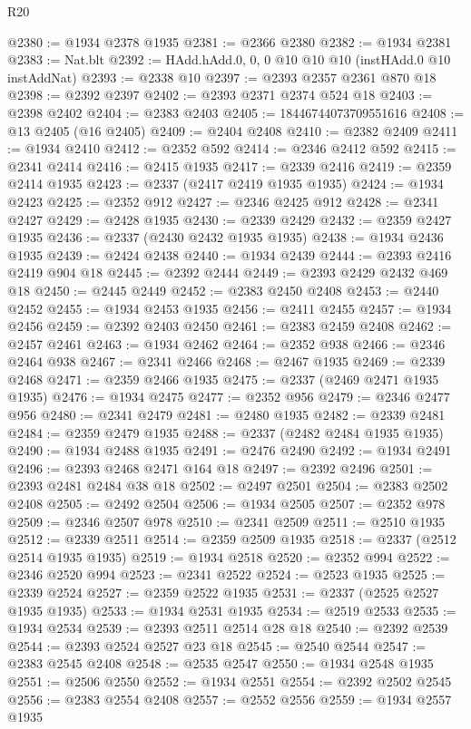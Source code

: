 \begin{lexlean}{R20}
\begin{coremodule}
@2380 := @1934 @2378 @1935
@2381 := @2366 @2380
@2382 := @1934 @2381
@2383 := Nat.blt
@2392 := HAdd.hAdd.{0, 0, 0} @10 @10 @10 (instHAdd.{0} @10 instAddNat)
@2393 := @2338 @10
@2397 := @2393 @2357 @2361 @870 @18
@2398 := @2392 @2397
@2402 := @2393 @2371 @2374 @524 @18
@2403 := @2398 @2402
@2404 := @2383 @2403
@2405 := 18446744073709551616
@2408 := @13 @2405 (@16 @2405)
@2409 := @2404 @2408
@2410 := @2382 @2409
@2411 := @1934 @2410
@2412 := @2352 @592
@2414 := @2346 @2412 @592
@2415 := @2341 @2414
@2416 := @2415 @1935
@2417 := @2339 @2416
@2419 := @2359 @2414 @1935
@2423 := @2337 (@2417 @2419 @1935 @1935)
@2424 := @1934 @2423
@2425 := @2352 @912
@2427 := @2346 @2425 @912
@2428 := @2341 @2427
@2429 := @2428 @1935
@2430 := @2339 @2429
@2432 := @2359 @2427 @1935
@2436 := @2337 (@2430 @2432 @1935 @1935)
@2438 := @1934 @2436 @1935
@2439 := @2424 @2438
@2440 := @1934 @2439
@2444 := @2393 @2416 @2419 @904 @18
@2445 := @2392 @2444
@2449 := @2393 @2429 @2432 @469 @18
@2450 := @2445 @2449
@2452 := @2383 @2450 @2408
@2453 := @2440 @2452
@2455 := @1934 @2453 @1935
@2456 := @2411 @2455
@2457 := @1934 @2456
@2459 := @2392 @2403 @2450
@2461 := @2383 @2459 @2408
@2462 := @2457 @2461
@2463 := @1934 @2462
@2464 := @2352 @938
@2466 := @2346 @2464 @938
@2467 := @2341 @2466
@2468 := @2467 @1935
@2469 := @2339 @2468
@2471 := @2359 @2466 @1935
@2475 := @2337 (@2469 @2471 @1935 @1935)
@2476 := @1934 @2475
@2477 := @2352 @956
@2479 := @2346 @2477 @956
@2480 := @2341 @2479
@2481 := @2480 @1935
@2482 := @2339 @2481
@2484 := @2359 @2479 @1935
@2488 := @2337 (@2482 @2484 @1935 @1935)
@2490 := @1934 @2488 @1935
@2491 := @2476 @2490
@2492 := @1934 @2491
@2496 := @2393 @2468 @2471 @164 @18
@2497 := @2392 @2496
@2501 := @2393 @2481 @2484 @38 @18
@2502 := @2497 @2501
@2504 := @2383 @2502 @2408
@2505 := @2492 @2504
@2506 := @1934 @2505
@2507 := @2352 @978
@2509 := @2346 @2507 @978
@2510 := @2341 @2509
@2511 := @2510 @1935
@2512 := @2339 @2511
@2514 := @2359 @2509 @1935
@2518 := @2337 (@2512 @2514 @1935 @1935)
@2519 := @1934 @2518
@2520 := @2352 @994
@2522 := @2346 @2520 @994
@2523 := @2341 @2522
@2524 := @2523 @1935
@2525 := @2339 @2524
@2527 := @2359 @2522 @1935
@2531 := @2337 (@2525 @2527 @1935 @1935)
@2533 := @1934 @2531 @1935
@2534 := @2519 @2533
@2535 := @1934 @2534
@2539 := @2393 @2511 @2514 @28 @18
@2540 := @2392 @2539
@2544 := @2393 @2524 @2527 @23 @18
@2545 := @2540 @2544
@2547 := @2383 @2545 @2408
@2548 := @2535 @2547
@2550 := @1934 @2548 @1935
@2551 := @2506 @2550
@2552 := @1934 @2551
@2554 := @2392 @2502 @2545
@2556 := @2383 @2554 @2408
@2557 := @2552 @2556
@2559 := @1934 @2557 @1935

\end{coremodule}
\end{lexlean}
